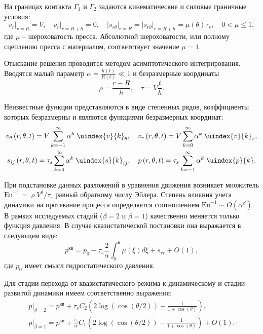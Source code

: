 На границах контакта $\Gamma_1$ и $\Gamma_2$ задаются кинематические и силовые граничные условия:
\begin{equation}
  v_{r}\lvert_{r=R} = V, \quad v_{r}\lvert_{r=R + h} = 0, \quad \lvert s_{r\theta}\lvert_{r=R} = \lvert s_{r\theta}\lvert_{r=R+h} = \mu(\theta) \tau_{s}, \quad 0 < \mu \le 1,
\end{equation}
где $\mu$ -- шероховатость пресса. Абсолютной шероховатости, или полному сцеплению пресса с материалом, соответствует значение $\mu = 1$.

Отыскание решения проводится методом асимптотического интегрирования. Вводятся малый параметр $\alpha = \frac{h(t)}{R(t)} \ll 1$ и безразмерные координаты
\begin{equation}
  \rho = \frac{r-R}{h}, \quad \tau = V \frac{t}{h}.
\end{equation}

Неизвестные функции представляются в виде степенных рядов, коэффициенты которых безразмерны и являются функциями безразмерных координат:
\begin{gather}
  v_{\theta}\left(r, \theta, t\right) = V \sum_{k=-1}^{\infty}{\alpha^{k} \; \uindex{v}{k}_{\theta}}, \quad v_{r}\left(r, \theta, t\right) = V \sum_{k=0}^{\infty}{\alpha^{k} \; \uindex{v}{k}_{r}},
  \\
  s_{ij}\left(r, \theta, t\right) = \tau_{s} \sum_{k=0}^{\infty}{\alpha^{k} \; \uindex{s}{k}_{ij}}, \quad p\left(r, \theta, t \right) = \tau_{s} \sum_{k=-1}^{\infty}{\alpha^{k} \; \uindex{p}{k}}.
\end{gather}

При подстановке данных разложений в уравнения движения возникает множитель $\text{Eu}^{-1}=\varrho V^2/\tau_s$ равный обратному числу Эйлера. Степень влияния учета динамики на протекание процесса определяется соотношением $\text{Eu}^{-1} \sim O(\alpha^\beta)$.
В рамках исследуемых стадий ($\beta=2$ и $\beta=1$) качественно меняется только функция давления. В случае квазистатической постановки она выражается в следующем виде:
\begin{equation}
  p^\text{кв} = p_0 - \tau_{s} \frac{2}{\alpha}\int_0^\theta \mu(\xi) d\xi + s_{rr} + O(1),
\end{equation}
где $p_0$ имеет смысл гидростатического давления.

Для стадии перехода от квазистатического режима к динамическому и стадии развитой динамики имеем соответственно выражения:
\begin{gather}
  p\lvert_{\beta=2} = p^\text{кв} + \tau_{s} C_2 \left(2\log{\left(\cos{\left({\theta / 2}\right)}\right)} - \frac{1}{1+\cos{\left(\theta\right)}}\right),
  \\
  p\lvert_{\beta=1} = p^\text{кв} + \frac{\tau_{s}}{\alpha} C_1 \left(2\log{\left(\cos{\left({\theta / 2}\right)}\right)} - \frac{1}{1+\cos{\left(\theta\right)}}\right) + O(1).
\end{gather}

